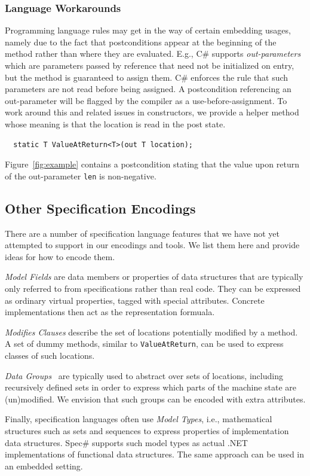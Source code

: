 \documentclass{sig-alternate}
\newcommand{\csharp}{C\#}
\begin{document}
\subsubsection{Language Workarounds}
\noindent
Programming language rules may get in the way of certain embedding
usages, namely due to the fact that postconditions appear at the
beginning of the method rather than where they are evaluated. E.g., 
\csharp{} supports \emph{out-parameters} which are parameters passed by
reference that need not be initialized on entry, but the method is
guaranteed to assign them. \csharp{} enforces the rule that such
parameters are not read before being assigned. A postcondition
referencing an out-parameter will be flagged by
the compiler as a use-before-assignment. To work around this and
related issues in constructors, we provide a helper method whose
meaning is that the location is read in the post state.
\begin{lstlisting}
  static T ValueAtReturn<T>(out T location);
\end{lstlisting}
Figure~\ref{fig:example} contains a postcondition stating that the
value upon return of the out-parameter \lstinline{len} is non-negative.

\subsection{Other Specification Encodings}
\noindent
There are a number of specification language features that we have not
yet attempted to support in our encodings and tools. We list them here
and provide ideas for how to encode them. 

\textit{Model Fields} are data members or properties of data
structures that are typically only referred to from specifications
rather than real code. They can be expressed as ordinary 
virtual properties, tagged with special attributes. Concrete
implementations then act as the representation formuala.

\textit{Modifies Clauses} describe the set of locations potentially
modified by a method. A set of dummy methods, similar to
\lstinline{ValueAtReturn}, can be used to express classes of such
locations. 

\textit{Data Groups}~\cite{datagroups} are typically used to abstract
over sets of locations, including recursively defined sets in order to
express which parts of the machine state are (un)modified. We
envision that such groups can be encoded with extra attributes.

Finally, specification languages often use \textit{Model Types}, i.e.,
mathematical structures such as sets and sequences to express
properties of implementation data structures. Spec\# supports such
model types as actual .NET implementations of functional data
structures. The same approach can be used in an embedded setting.
\end{document}
